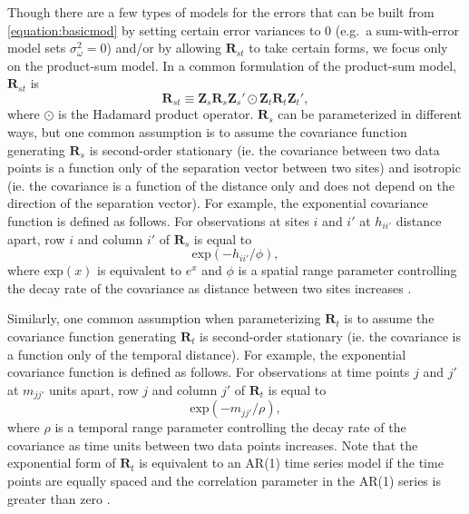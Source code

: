 \documentclass[]{interact}
\theoremstyle{plain}%
\theoremstyle{definition}
\theoremstyle{remark}
\begin{document}
Though there are a few types of models for the errors that can be built
from \ref{equation:basicmod} by setting certain error variances to 0
(e.g.~a sum-with-error model sets \(\sigma^2_{\omega} = 0\)) and/or by
allowing \(\mathbf{R}_{st}\) to take certain forms, we focus only on the
product-sum model. In a common formulation of the product-sum model,
\(\mathbf{R}_{st}\) is \mbox{} \begin{equation*}
\mathbf{R}_{st} \equiv \mathbf{Z}_{s} \mathbf{R}_{s} \mathbf{Z}_{s}' \odot \mathbf{Z}_t \mathbf{R}_t \mathbf{Z}_t',
\end{equation*} \noindent where \(\odot\) is the Hadamard product
operator. \(\mathbf{R}_s\) can be parameterized in different ways, but
one common assumption is to assume the covariance function generating
\(\mathbf{R}_s\) is second-order stationary (ie. the covariance between
two data points is a function only of the separation vector between two
sites) and isotropic (ie. the covariance is a function of the distance
only and does not depend on the direction of the separation vector). For
example, the exponential covariance function is defined as follows. For
observations at sites \(i\) and \(i'\) at \(h_{ii'}\) distance apart,
row \(i\) and column \(i'\) of \(\mathbf{R}_{s}\) is equal to \mbox{}
\begin{equation}
\label{equation:spatcov}
\text{exp}(-h_{ii'} / \phi),
\end{equation} \noindent where \(\text{exp}(x)\) is equivalent to
\(e^x\) and \(\phi\) is a spatial range parameter controlling the decay
rate of the covariance as distance between two sites increases
\citep{cressie2015statistics}.

Similarly, one common assumption when parameterizing \(\mathbf{R}_t\) is
to assume the covariance function generating \(\mathbf{R}_t\) is
second-order stationary (ie. the covariance is a function only of the
temporal distance). For example, the exponential covariance function is
defined as follows. For observations at time points \(j\) and \(j'\) at
\(m_{jj'}\) units apart, row \(j\) and column \(j'\) of
\(\mathbf{R}_{t}\) is equal to \mbox{} \begin{equation}
\label{equation:tempcov}
\text{exp}(-m_{jj'} / \rho),
\end{equation} \noindent where \(\rho\) is a temporal range parameter
controlling the decay rate of the covariance as time units between two
data points increases. Note that the exponential form of
\(\mathbf{R}_t\) is equivalent to an AR(1) time series model if the time
points are equally spaced and the correlation parameter in the AR(1)
series is greater than zero \citep{schabenberger2017statistical}.
\end{document}

